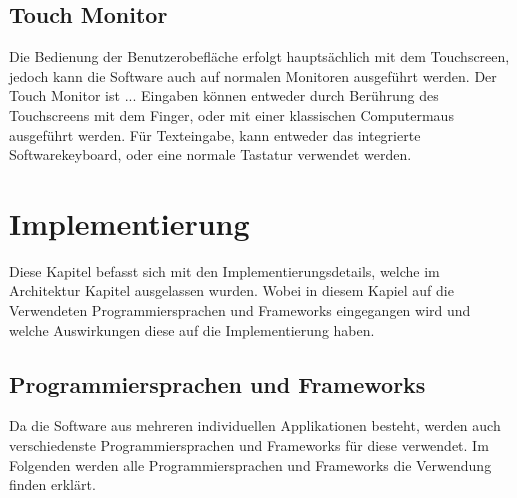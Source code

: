 \documentclass[12pt,a4paper,bibliography=totocnumbered,listof=totocnumbered]{article}
\begin{document}
\subsection{Touch Monitor}
Die Bedienung der Benutzerobefläche erfolgt hauptsächlich mit dem Touchscreen, jedoch kann die Software auch auf normalen Monitoren ausgeführt werden.
Der Touch Monitor ist ...%
Eingaben können entweder durch Berührung des Touchscreens mit dem Finger, oder mit einer klassischen Computermaus ausgeführt werden.
Für Texteingabe, kann entweder das integrierte Softwarekeyboard, oder eine normale Tastatur verwendet werden.



\pagebreak
\section{Implementierung}
Diese Kapitel befasst sich mit den Implementierungsdetails, welche im Architektur Kapitel ausgelassen wurden. Wobei in diesem 
Kapiel auf die Verwendeten Programmiersprachen und Frameworks eingegangen wird und welche Auswirkungen diese auf 
die Implementierung haben.

\subsection{Programmiersprachen und Frameworks}
Da die Software aus mehreren individuellen Applikationen besteht, werden auch verschiedenste Programmiersprachen und Frameworks für diese verwendet.
Im Folgenden werden alle Programmiersprachen und Frameworks die Verwendung finden erklärt.
\end{document}
